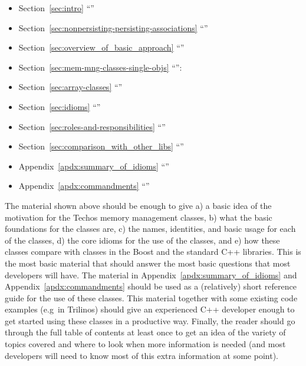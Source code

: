 \documentclass[pdf,ps2pdf,11pt]{SANDreport}
\begin{document}
\begin{itemize}

{}\item Section~\ref{sec:intro} ``''

{}\item Section~\ref{sec:nonpersisting-persisting-associations}
``''

{}\item Section~\ref{sec:overview_of_basic_approach}
``''

{}\item Section~\ref{sec:mem-mng-classes-single-objs}
``{}'':\\[2ex]

{}\item Section~\ref{sec:array-classes}
``{}''

{}\item Section~\ref{sec:idioms} ``{}''

{}\item Section~\ref{sec:roles-and-responsibilities}
``''

{}\item Section~\ref{sec:comparison_with_other_libs}
``{}''

{}\item Appendix~\ref{apdx:summary_of_idioms}
``{}''

{}\item Appendix~\ref{apdx:commandments}
``{}''

\end{itemize}

The material shown above should be enough to give a) a basic idea of
the motivation for the Techos memory management classes, b) what the
basic foundations for the classes are, c) the names, identities, and
basic usage for each of the classes, d) the core idioms for the use of
the classes, and e) how these classes compare with classes in the
Boost and the standard C++ libraries.  This is the most basic material
that should answer the most basic questions that most developers will
have.  The material in Appendix~\ref{apdx:summary_of_idioms} and
Appendix~\ref{apdx:commandments} should be used as a (relatively)
short reference guide for the use of these classes.  This material
together with some existing code examples (e.g\ in Trilinos) should
give an experienced C++ developer enough to get started using these
classes in a productive way.  Finally, the reader should go through
the full table of contents at least once to get an idea of the variety
of topics covered and where to look when more information is needed
(and most developers will need to know most of this extra information
at some point).
\end{document}
